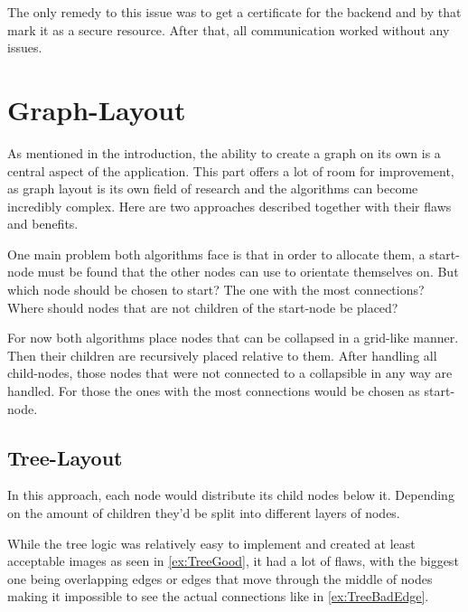 The only remedy to this issue was to get a certificate for the backend and by that mark it as a secure resource. After that, all communication worked without any issues.

\newpage
\section{Graph-Layout}
As mentioned in the introduction, the ability to create a graph on its own is a central aspect of the application. This part offers a lot of room for improvement, as graph layout is its own field of research and the algorithms can become incredibly complex. Here are two approaches described together with their flaws and benefits.

One main problem both algorithms face is that in order to allocate them, a start-node must be found that the other nodes can use to orientate themselves on. But which node should be chosen to start? The one with the most connections? Where should nodes that are not children of the start-node be placed? 

For now both algorithms place nodes that can be collapsed in a grid-like manner. Then their children are recursively placed relative to them. After handling all child-nodes, those nodes that were not connected to a collapsible in any way are handled. For those the ones with the most connections would be chosen as start-node.

\subsection{Tree-Layout}
In this approach, each node would distribute its child nodes below it. Depending on the amount of children they'd be split into different layers of nodes.

While the tree logic was relatively easy to implement and created at least acceptable images as seen in \autoref{ex:TreeGood}, it had a lot of flaws, with the biggest one being overlapping edges or edges that move through the middle of nodes making it impossible to see the actual connections like in \autoref{ex:TreeBadEdge}.

